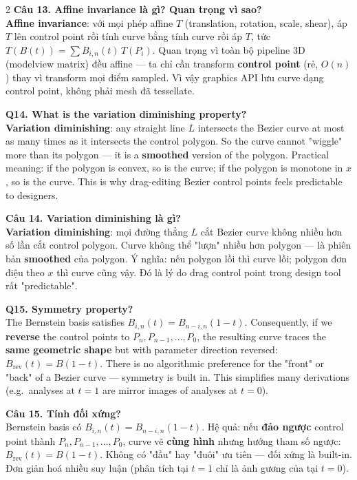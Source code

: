 \begin{paracol}{2}
\textbf{Câu 13. Affine invariance là gì? Quan trọng vì sao?}\\
\textbf{Affine invariance}: với mọi phép affine $T$ (translation, rotation, scale, shear), áp $T$ lên control point rồi tính curve bằng tính curve rồi áp $T$, tức $T(B(t))=\sum B_{i,n}(t)\, T(P_i)$. Quan trọng vì toàn bộ pipeline 3D (modelview matrix) đều affine — ta chỉ cần transform \textbf{control point} (rẻ, $O(n)$) thay vì transform mọi điểm sampled. Vì vậy graphics API lưu curve dạng control point, không phải mesh đã tessellate.

\switchcolumn*

\textbf{Q14. What is the variation diminishing property?}\\
\textbf{Variation diminishing}: any straight line $L$ intersects the Bezier curve at most as many times as it intersects the control polygon. So the curve cannot "wiggle" more than its polygon — it is a \textbf{smoothed} version of the polygon. Practical meaning: if the polygon is convex, so is the curve; if the polygon is monotone in $x$, so is the curve. This is why drag-editing Bezier control points feels predictable to designers.

\switchcolumn

\textbf{Câu 14. Variation diminishing là gì?}\\
\textbf{Variation diminishing}: mọi đường thẳng $L$ cắt Bezier curve không nhiều hơn số lần cắt control polygon. Curve không thể "lượn" nhiều hơn polygon — là phiên bản \textbf{smoothed} của polygon. Ý nghĩa: nếu polygon lồi thì curve lồi; polygon đơn điệu theo $x$ thì curve cũng vậy. Đó là lý do drag control point trong design tool rất "predictable".

\switchcolumn*

\textbf{Q15. Symmetry property?}\\
The Bernstein basis satisfies $B_{i,n}(t)=B_{n-i,n}(1-t)$. Consequently, if we \textbf{reverse} the control points to $P_n, P_{n-1}, \ldots, P_0$, the resulting curve traces the \textbf{same geometric shape} but with parameter direction reversed: $B_{\text{rev}}(t)=B(1-t)$. There is no algorithmic preference for the "front" or "back" of a Bezier curve — symmetry is built in. This simplifies many derivations (e.g.\ analyses at $t=1$ are mirror images of analyses at $t=0$).

\switchcolumn

\textbf{Câu 15. Tính đối xứng?}\\
Bernstein basis có $B_{i,n}(t)=B_{n-i,n}(1-t)$. Hệ quả: nếu \textbf{đảo ngược} control point thành $P_n, P_{n-1}, \ldots, P_0$, curve vẽ \textbf{cùng hình} nhưng hướng tham số ngược: $B_{\text{rev}}(t)=B(1-t)$. Không có "đầu" hay "đuôi" ưu tiên — đối xứng là built-in. Đơn giản hoá nhiều suy luận (phân tích tại $t=1$ chỉ là ảnh gương của tại $t=0$).


\end{paracol}
